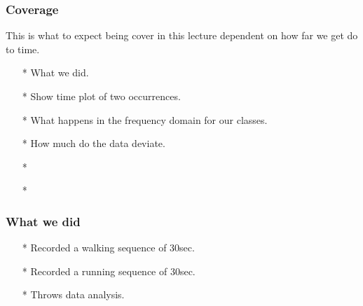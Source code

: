 \begin{frame}
\frametitle{Coverage}
This is what to expect being cover in this lecture dependent on how far we get do to time.
\begin{itemize}
    \item[*]  What we did.
    \item[*]  Show time plot of two occurrences.
    \item[*]  What happens in the frequency domain for our classes.
    \item[*]  How much do the data deviate.
    \item[*]
    \item[*]
\end{itemize}

\end{frame}

\begin{frame}
    \frametitle{What we did}
    \begin{itemize}
        \item[*] Recorded a walking sequence of 30sec.
        \item[*] Recorded a running sequence of 30sec.
        \item[*] Throws data analysis.
    \end{itemize}

\end{frame}

